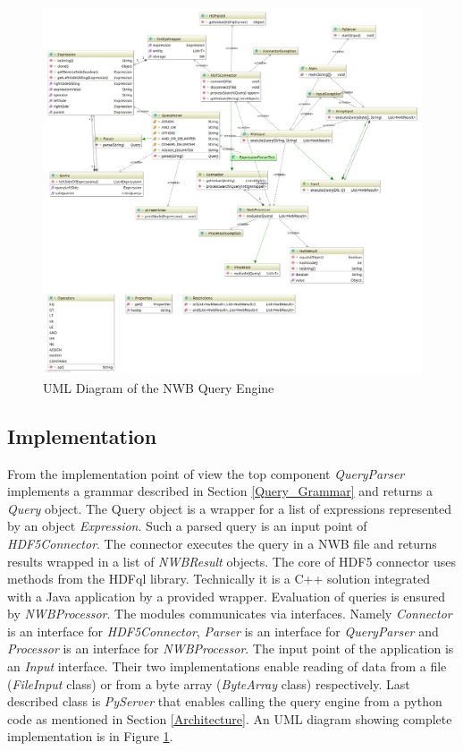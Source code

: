 \documentclass[utf8]{frontiersSCNS} %
\begin{document}
\begin{figure}
  \includegraphics[width=18cm]{diagram}
\caption{UML Diagram of the NWB Query Engine}
\label{fig:diagram}
\end{figure}


\subsection{Implementation}
\label{Implementation}

From the implementation point of view the top component \emph{QueryParser} implements a grammar described in Section \ref{Query_Grammar} and returns a \emph{Query} object. The Query object is a wrapper for a list of expressions represented by an object \emph{Expression}. Such a parsed query is an input point of \emph{HDF5Connector}. The connector executes the query in a NWB file and returns results wrapped in a list of \emph{NWBResult} objects. The core of HDF5 connector uses methods from the HDFql library. Technically it is a  C++ solution integrated with a Java application by a provided wrapper. Evaluation of queries is ensured by \emph{NWBProcessor}. The modules communicates via interfaces. Namely \emph{Connector} is an interface for \emph{HDF5Connector}, \emph{Parser} is an interface for \emph{QueryParser} and \emph{Processor} is an interface for \emph{NWBProcessor}. The input point of the application is an \emph{Input} interface. Their two implementations enable reading of data from a file (\emph{FileInput} class) or from a byte array (\emph{ByteArray} class) respectively. Last described class is \emph{PyServer} that enables calling the query engine from a python code as mentioned in Section \ref{Architecture}. An UML diagram showing complete implementation is in Figure \ref{fig:diagram}.
\end{document}
